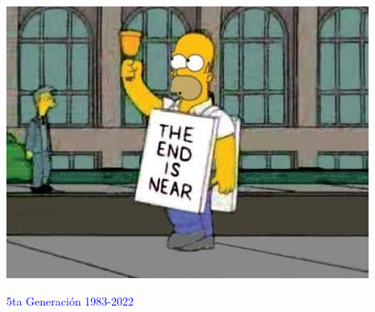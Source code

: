 \documentclass[10pt,xcolor={dvipsnames}]{beamer}
\begin{document}
\begin{frame}
\begin{center}
\includegraphics[scale=0.5]{Figures/theend}
\end{center}
\end{frame}

\begin{frame}
\Huge{\textcolor{blue}{5ta Generación 1983-2022}}
\end{frame}
\end{document}
